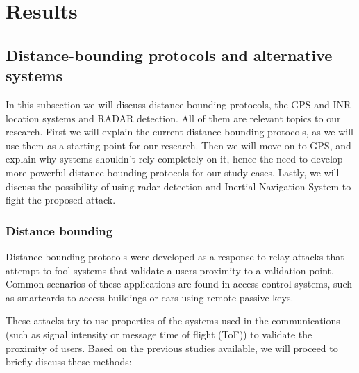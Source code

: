 \documentclass{article}
\begin{document}
\section{Results}
\label{sec:results}

\subsection{Distance-bounding protocols and alternative systems}
\label{sec:background}

In this subsection we will discuss distance bounding protocols, the GPS and INR location systems and RADAR detection. All of them are relevant topics to our research. First we will explain the current distance bounding protocols, as we will use them as a starting point for our research. Then we will move on to GPS, and explain why systems shouldn't rely completely on it, hence the need to develop more powerful distance bounding protocols for our study cases. Lastly, we will discuss the possibility of using radar detection and Inertial Navigation System to fight the proposed attack.

\subsubsection{Distance bounding}

Distance bounding protocols were developed as a response to relay attacks that attempt to fool systems that validate a users proximity to a validation point. Common scenarios of these applications are found in access control systems, such as smartcards to access buildings or cars using remote passive keys.

These attacks try to use properties of the systems used in the communications (such as signal intensity or message time of flight (ToF)) to validate the proximity of users. Based on the previous studies available\cite{capkun2006secure}, we will proceed to briefly discuss these methods:
\end{document}
